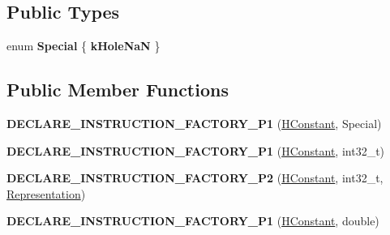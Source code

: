 \subsection*{Public Types}
\begin{DoxyCompactItemize}
\item 
enum {\bfseries Special} \{ {\bfseries k\+Hole\+NaN}
 \}\hypertarget{classv8_1_1internal_1_1_h_constant_a5fac96b95af416dc777e8823ef1a6c27}{}\label{classv8_1_1internal_1_1_h_constant_a5fac96b95af416dc777e8823ef1a6c27}

\end{DoxyCompactItemize}
\subsection*{Public Member Functions}
\begin{DoxyCompactItemize}
\item 
{\bfseries D\+E\+C\+L\+A\+R\+E\+\_\+\+I\+N\+S\+T\+R\+U\+C\+T\+I\+O\+N\+\_\+\+F\+A\+C\+T\+O\+R\+Y\+\_\+\+P1} (\hyperlink{classv8_1_1internal_1_1_h_constant}{H\+Constant}, Special)\hypertarget{classv8_1_1internal_1_1_h_constant_a8364ab6036c7fad67966da7ca7fc3c74}{}\label{classv8_1_1internal_1_1_h_constant_a8364ab6036c7fad67966da7ca7fc3c74}

\item 
{\bfseries D\+E\+C\+L\+A\+R\+E\+\_\+\+I\+N\+S\+T\+R\+U\+C\+T\+I\+O\+N\+\_\+\+F\+A\+C\+T\+O\+R\+Y\+\_\+\+P1} (\hyperlink{classv8_1_1internal_1_1_h_constant}{H\+Constant}, int32\+\_\+t)\hypertarget{classv8_1_1internal_1_1_h_constant_a51a4d876091a2fb2823c11088887fd1a}{}\label{classv8_1_1internal_1_1_h_constant_a51a4d876091a2fb2823c11088887fd1a}

\item 
{\bfseries D\+E\+C\+L\+A\+R\+E\+\_\+\+I\+N\+S\+T\+R\+U\+C\+T\+I\+O\+N\+\_\+\+F\+A\+C\+T\+O\+R\+Y\+\_\+\+P2} (\hyperlink{classv8_1_1internal_1_1_h_constant}{H\+Constant}, int32\+\_\+t, \hyperlink{classv8_1_1internal_1_1_representation}{Representation})\hypertarget{classv8_1_1internal_1_1_h_constant_aa7878edac435204a1838b33006aafd16}{}\label{classv8_1_1internal_1_1_h_constant_aa7878edac435204a1838b33006aafd16}

\item 
{\bfseries D\+E\+C\+L\+A\+R\+E\+\_\+\+I\+N\+S\+T\+R\+U\+C\+T\+I\+O\+N\+\_\+\+F\+A\+C\+T\+O\+R\+Y\+\_\+\+P1} (\hyperlink{classv8_1_1internal_1_1_h_constant}{H\+Constant}, double)\hypertarget{classv8_1_1internal_1_1_h_constant_af541d2522b506250d73256a07d67a4dd}{}\label{classv8_1_1internal_1_1_h_constant_af541d2522b506250d73256a07d67a4dd}


\end{DoxyCompactItemize}
